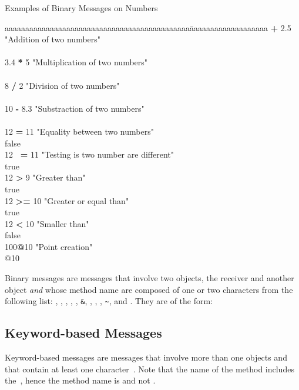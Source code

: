 \begin{scriptwithtitle}{Examples of Binary Messages on Numbers}\label{scr:binary}
\begin{tabbing}
aaaaaaaaaaaaaaaaaaaaaaaaaaaaaaaaaaaaaaaaaaaaa\=aaaaaaaaaaaaaaaaaaa \textbf{+} 2.5           \>"Addition of two numbers"\\
                   \\
3.4 \textbf{*} 5                               \>"Multiplication of two numbers"\\
\\
8 \textbf{/} 2                               \>"Division of two numbers"\\
\\
10 \textbf{-} 8.3                       \>"Substraction of two numbers"\\
\\
12 \textbf{=} 11                     \>"Equality between two numbers"\\
\pr false\\
12 \textbf{~=} 11                \>"Testing is two number are different"\\
\pr true\\
12 \textbf{>} 9                 \>"Greater than"\\
\pr true\\
12 \textbf{>=} 10          \>"Greater or equal  than"          \\
\pr true\\
12 \textbf{<} 10         \>"Smaller  than"\\
\pr false\\
100\textbf{@}10     \>"Point creation"\\
@10
\end{tabbing}
\end{scriptwithtitle}

\begin{largecadre}{Binary messages are messages that involve two objects, the receiver and another object \textit{and} whose method name are composed of  one or two characters from the following list: \ct{+}, \ct{-}, \ct{*}, \ct{/}, \ct{|}, \texttt{\&}, \ct{=}, \ct{>}, \ct{<}, \texttt{\~}, and .
They are of the form: }
\end{largecadre}

\subsection*{Keyword-based Messages} 
Keyword-based messages are messages that involve more than one objects and that contain at least one character~\ct{:}. Note that the name of the method includes the~\ct{:}, hence the method name is  and not . 

